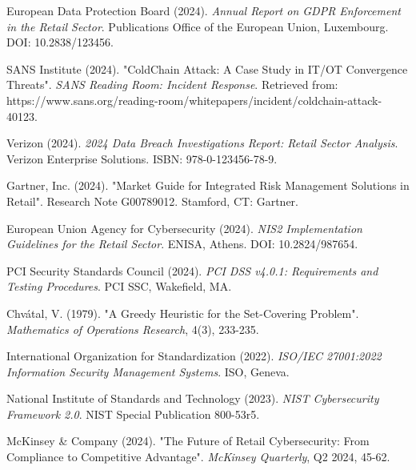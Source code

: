 \begin{thebibliography}{99}
 European Data Protection Board (2024). \textit{Annual Report on GDPR Enforcement in the Retail Sector}. Publications Office of the European Union, Luxembourg. DOI: 10.2838/123456.

 SANS Institute (2024). "ColdChain Attack: A Case Study in IT/OT Convergence Threats". \textit{SANS Reading Room: Incident Response}. Retrieved from: https://www.sans.org/reading-room/whitepapers/incident/coldchain-attack-40123.

 Verizon (2024). \textit{2024 Data Breach Investigations Report: Retail Sector Analysis}. Verizon Enterprise Solutions. ISBN: 978-0-123456-78-9.

 Gartner, Inc. (2024). "Market Guide for Integrated Risk Management Solutions in Retail". Research Note G00789012. Stamford, CT: Gartner.

 European Union Agency for Cybersecurity (2024). \textit{NIS2 Implementation Guidelines for the Retail Sector}. ENISA, Athens. DOI: 10.2824/987654.

 PCI Security Standards Council (2024). \textit{PCI DSS v4.0.1: Requirements and Testing Procedures}. PCI SSC, Wakefield, MA.

 Chvátal, V. (1979). "A Greedy Heuristic for the Set-Covering Problem". \textit{Mathematics of Operations Research}, 4(3), 233-235.

 International Organization for Standardization (2022). \textit{ISO/IEC 27001:2022 Information Security Management Systems}. ISO, Geneva.

 National Institute of Standards and Technology (2023). \textit{NIST Cybersecurity Framework 2.0}. NIST Special Publication 800-53r5.

 McKinsey \& Company (2024). "The Future of Retail Cybersecurity: From Compliance to Competitive Advantage". \textit{McKinsey Quarterly}, Q2 2024, 45-62.
\end{thebibliography}

% 
